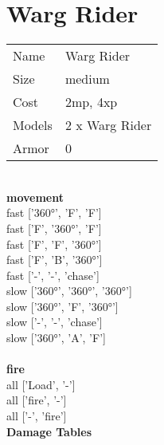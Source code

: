 \pagebreak

\section{ Warg Rider }

\begin{tabular}{ll}
  Name & Warg Rider \\
  Size & medium\\
  Cost & 2mp, 4xp\\
  Models & 2 x Warg Rider\\
  Armor & 0\\
\end{tabular}





\ \\ {\bf movement } \\
fast ['360°', 'F', 'F'] \\
fast ['F', '360°', 'F'] \\
fast ['F', 'F', '360°'] \\
fast ['F', 'B', '360°'] \\
fast ['-', '-', 'chase'] \\
slow ['360°', '360°', '360°'] \\
slow ['360°', 'F', '360°'] \\
slow ['-', '-', 'chase'] \\
slow ['360°', 'A', 'F'] \\
\ \\ {\bf fire } \\
all ['Load', '-'] \\
all ['fire', '-'] \\
all ['-', 'fire'] \\


{\bf Damage Tables} \\











